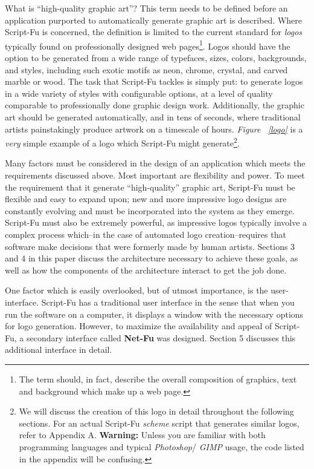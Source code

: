 \documentclass{article}
\newcommand{\figref}[1]{{\em Figure ~\ref{#1}}\xspace}
\begin{document}
What is ``high-quality graphic art''?  This term needs to be defined
before an application purported to automatically generate graphic art
is described.  Where Script-Fu is concerned, the definition is limited
to the current standard for {\it logos} typically found on
professionally designed web pages\footnote {The term should, in fact,
describe the overall composition of graphics, text and background
which make up a web page.}.  Logos should have the option to be
generated from a wide range of typefaces, sizes, colors, backgrounds,
and styles, including such exotic motifs as neon, chrome, crystal, and
carved marble or wood.  The task that Script-Fu tackles is simply put:
to generate logos in a wide variety of styles with configurable
options, at a level of quality comparable to professionally done
graphic design work.  Additionally, the graphic art should be
generated automatically, and in tens of seconds, where traditional
artists painstakingly produce artwork on a timescale of hours.
\figref{logo} is a \emph{very} simple example of a logo which
Script-Fu might generate\footnote {We will discuss the creation of
this logo in detail throughout the following sections.  For an actual
Script-Fu {\it scheme} script that generates similar logos, refer to
Appendix A.  {\bf Warning:} Unless you are familiar with both
programming languages and typical {\it Photoshop}\cite{photoshop}/{\it
GIMP}\cite{GIMP} usage, the code listed in the appendix will be
confusing.}.

Many factors must be considered in the design of an application which
meets the requirements discussed above.  Most important are
flexibility and power.  To meet the requirement that it generate
``high-quality'' graphic art, Script-Fu must be flexible and easy to
expand upon; new and more impressive logo designs are constantly
evolving and must be incorporated into the system as they emerge.
Script-Fu must also be extremely powerful, as impressive logos
typically involve a complex process which--in the case of automated
logo creation--requires that software make decisions that were
formerly made by human artists.  Sections 3 and 4 in this paper
discuss the architecture necessary to achieve these goals, as well as
how the components of the architecture interact to get the job done.

One factor which is easily overlooked, but of utmost importance, is
the user-interface.  Script-Fu has a traditional user interface in the
sense that when you run the software on a computer, it displays a
window with the necessary options for logo generation.  However, to
maximize the availability and appeal of Script-Fu, a secondary
interface called {\bf Net-Fu} was designed.  Section 5 discusses this
additional interface in detail.
\end{document}
